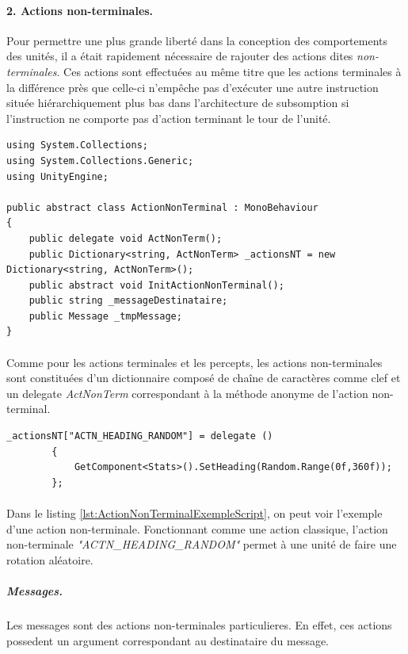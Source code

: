 \documentclass{report}
\begin{document}
\paragraph{2. Actions non-terminales.}
Pour permettre une plus grande liberté dans la conception des comportements des unités, il a était rapidement nécessaire de rajouter des actions dites \textit{non-terminales}. Ces actions sont effectuées au même titre que les actions terminales à la différence près que celle-ci n’empêche pas d’exécuter une autre instruction située hiérarchiquement plus bas dans l'architecture de subsomption si l'instruction ne comporte pas d'action terminant le tour de l'unité.

\begin{lstlisting}[language={[Sharp]C},label={lst:ActionNonTerminalScript}, caption=Code du script ActionNonTerminal.cs]
using System.Collections;
using System.Collections.Generic;
using UnityEngine;

public abstract class ActionNonTerminal : MonoBehaviour
{
    public delegate void ActNonTerm();
    public Dictionary<string, ActNonTerm> _actionsNT = new Dictionary<string, ActNonTerm>();
    public abstract void InitActionNonTerminal();
    public string _messageDestinataire;
    public Message _tmpMessage;
}

\end{lstlisting}
\paragraph{}
Comme pour les actions terminales et les percepts, les actions non-terminales sont constituées d'un dictionnaire composé de chaîne de caractères comme clef et un delegate \textit{ActNonTerm} correspondant à la méthode anonyme de l'action non-terminal.

\begin{lstlisting}[language={[Sharp]C},label={lst:ActionNonTerminalExempleScript}, caption=Exemple d'une action non-terminale]
        _actionsNT["ACTN_HEADING_RANDOM"] = delegate ()
        {
            GetComponent<Stats>().SetHeading(Random.Range(0f,360f));
        };
\end{lstlisting}

\paragraph{}
Dans le listing \ref{lst:ActionNonTerminalExempleScript}, on peut voir l'exemple d'une action non-terminale. Fonctionnant comme une action classique, l'action non-terminale \textit{"ACTN\_HEADING\_RANDOM"} permet à une unité de faire une rotation aléatoire.
\subparagraph{Messages.}
Les messages sont des actions non-terminales particulieres. En effet, ces actions possedent un argument correspondant au destinataire du message.
\end{document}
